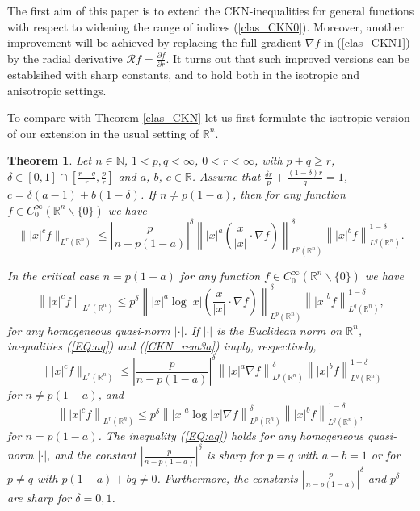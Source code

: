 \documentclass[a4paper,12pt,reqno]{amsart}
\renewcommand\eqref[1]{(\ref{#1})} %
\numberwithin{equation}{section}
\theoremstyle{plain}
\newtheorem{thm}{Theorem}[section]
\theoremstyle{definition}
\newcommand{\Rn}{\mathbb R^{n}}
\begin{document}
The first aim of this paper is to extend the CKN-inequalities for general functions with respect to widening the range of indices \eqref{clas_CKN0}. Moreover, another improvement will be achieved by replacing the full gradient $\nabla f$ in \eqref{clas_CKN1} by the radial derivative
$\mathcal{R}f=\frac{\partial f}{\partial r}$. It turns out that such improved versions can be establsihed with sharp constants, and to hold both in the isotropic and anisotropic settings.

To compare with Theorem \ref{clas_CKN} let us first formulate the isotropic version of our extension in the usual setting of $\Rn$.

\begin{thm}\label{clas_CKN-2}
Let $n\in\mathbb{N}$, $1<p,q<\infty$, $0<r<\infty$, with $p+q\geq r$, $\delta\in[0,1]\cap\left[\frac{r-q}{r},\frac{p}{r}\right]$ and $a$, $b$, $c\in\mathbb{R}$. Assume that $\frac{\delta r}{p}+\frac{(1-\delta)r}{q}=1$,  $c=\delta(a-1)+b(1-\delta)$. If $n\neq p(1-a)$, then for any function $f\in C_{0}^{\infty}(\mathbb{R}^{n}\backslash\{0\})$ we have
\begin{equation}\label{EQ:aq}
\||x|^{c}f\|_{L^{r}(\Rn)}
\leq \left|\frac{p}{n-p(1-a)}\right|^{\delta} \left\||x|^{a}\left(\frac{x}{|x|}\cdot\nabla f\right)\right\|^{\delta}_{L^{p}(\Rn)}
\left\||x|^{b}f\right\|^{1-\delta}_{L^{q}(\Rn)}.
\end{equation}

In the critical case $n=p(1-a)$ for any function $f\in C_{0}^{\infty}(\mathbb{R}^{n}\backslash\{0\})$ we have
\begin{equation}\label{CKN_rem3a}
\left\||x|^{c}f\right\|_{L^{r}(\Rn)}
\leq p^{\delta} \left\||x|^{a}\log|x|\left(\frac{x}{|x|}\cdot\nabla f\right)\right\|^{\delta}_{L^{p}(\Rn)}
\left\||x|^{b}f\right\|^{1-\delta}_{L^{q}(\Rn)},
\end{equation}
for any homogeneous quasi-norm $|\cdot|$. If $|\cdot|$ is the Euclidean norm on $\Rn$, inequalities
\eqref{EQ:aq} and \eqref{CKN_rem3a} imply, respectively,
\begin{equation}\label{EQ:aqe}
\||x|^{c}f\|_{L^{r}(\Rn)}
\leq \left|\frac{p}{n-p(1-a)}\right|^{\delta} \left\||x|^{a}\nabla f\right\|^{\delta}_{L^{p}(\Rn)}
\left\||x|^{b}f\right\|^{1-\delta}_{L^{q}(\Rn)}
\end{equation}
for $n\neq p(1-a)$, and
\begin{equation}\label{CKN_rem3ae}
\left\||x|^{c}f\right\|_{L^{r}(\Rn)}
\leq p^{\delta} \left\||x|^{a}\log|x|\nabla f\right\|^{\delta}_{L^{p}(\Rn)}
\left\||x|^{b}f\right\|^{1-\delta}_{L^{q}(\Rn)},
\end{equation}
for $n=p(1-a)$. The inequality \eqref{EQ:aq} holds for any homogeneous quasi-norm $|\cdot|$, and the constant
$\left|\frac{p}{n-p(1-a)}\right|^{\delta}$ is sharp for $p=q$ with $a-b=1$ or for $p\neq q$ with $p(1-a)+bq\neq0$. Furthermore, the constants $\left|\frac{p}{n-p(1-a)}\right|^{\delta}$ and $p^{\delta}$ are sharp for $\delta=\overline{0,1}$.
\end{thm}
\end{document}
